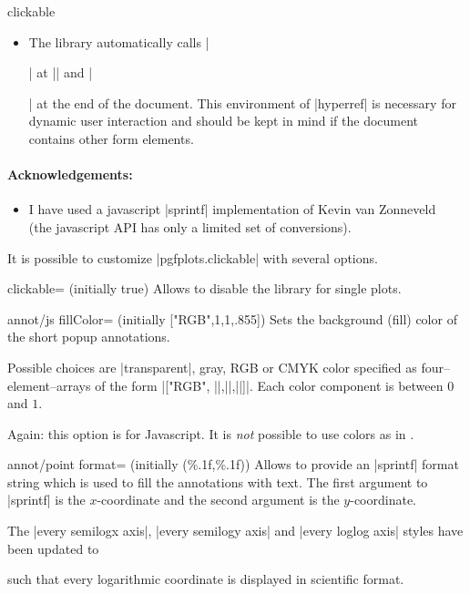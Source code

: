 \begin{pgfplotslibrary}{clickable}
\begin{itemize}
		\item The library automatically calls |\begin{Form}| at || and |\end{Form}| at the end of the document. This environment of |hyperref| is necessary for dynamic user interaction and should be kept in mind if the document contains other form elements.
	\end{itemize}

	\paragraph{Acknowledgements:}
	\begin{itemize}
		\item I have used a javascript |sprintf| implementation of Kevin van Zonneveld~\cite{phptojs} (the javascript API has only a limited set of conversions).
	\end{itemize}
\end{pgfplotslibrary}

It is possible to customize |pgfplots.clickable| with several options.

\begin{pgfplotskey}{clickable= (initially true)}
	Allows to disable the library for single plots.
\end{pgfplotskey}

\begin{pgfplotskey}{annot/js fillColor= (initially ["RGB",1,1,.855])}
	Sets the background (fill) color of the short popup annotations. 
	
	Possible choices are |transparent|, gray, RGB or CMYK color specified as four--element--arrays of the form
	|["RGB", ||,||,||]|. Each color component is between $0$ and $1$.

	Again: this option is for Javascript. It is \emph{not} possible to use colors as in \pgfname.
\end{pgfplotskey}

\begin{pgfplotskey}{annot/point format= (initially {(\%.1f,\%.1f)})}
	Allows to provide an |sprintf| format string which is used to fill the annotations with text. 
	The first argument to |sprintf| is the $x$-coordinate and the second argument is the $y$-coordinate.

	The |every semilogx axis|, |every semilogy axis| and |every loglog axis| styles have been updated to
\begin{codeexample}
\end{codeexample}
	\noindent such that every logarithmic coordinate is displayed in scientific format.
\end{pgfplotskey}

